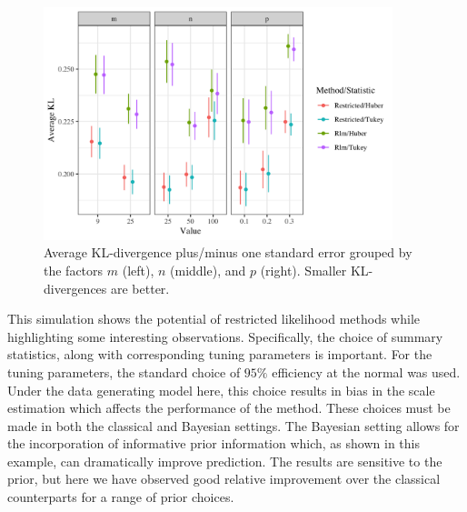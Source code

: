 \documentclass[ba]{imsart}
\begin{document}
\begin{figure}[t]
\centering
\includegraphics[width = 4in]{kl_sim2_mnp.png}
\caption{Average KL-divergence plus/minus one standard error grouped by the factors $m$ (left), $n$ (middle), and $p$ (right).  Smaller KL-divergences are better.}
\label{kl_mnp}
\end{figure}

This simulation shows the potential of restricted likelihood methods while highlighting some interesting observations. Specifically, the choice of summary statistics, along with corresponding tuning parameters is important. For the tuning parameters, the standard choice of $95\%$ efficiency at the normal was used.  Under the data generating model here, this choice results in bias in the scale estimation which affects the performance of the method. These choices must be made in both the classical and Bayesian settings. The Bayesian setting allows for the incorporation of informative prior information which, as shown in this example, can dramatically improve prediction. The results are sensitive to the prior, but here we have observed good relative improvement over the classical counterparts for a range of prior choices.   
\end{document}
